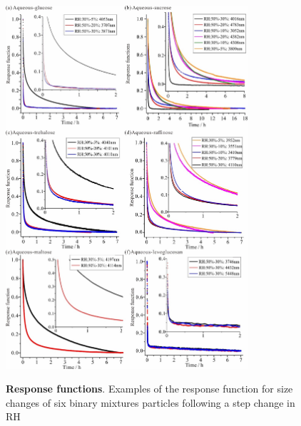 \begin{figure}
    \centering
    \caption{\textbf{Response functions}. Examples of the response function for size changes of six binary mixtures particles following a step change in RH}
    \includegraphics[width=0.8\textwidth]{chapters/water_hopping/figures/image004.jpg}
    \label{fig:wat_s2}
\end{figure}

